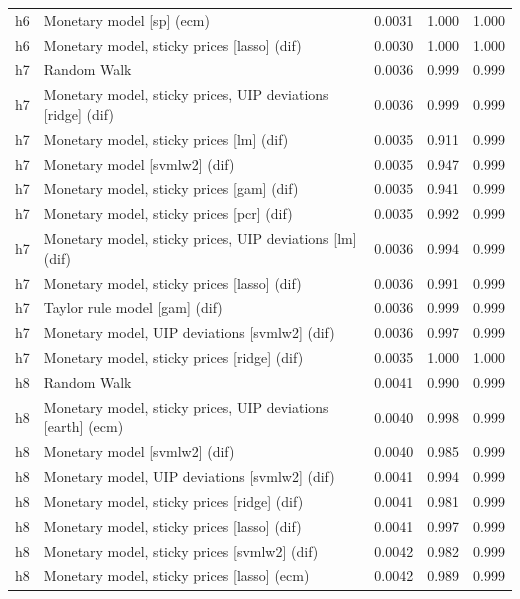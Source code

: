 \begin{ThreePartTable}
\begin{longtable}[t]{cp{5.5cm}ccc}
h6 & \raggedright Monetary model [sp] (ecm) & 0.0031 & 1.000 & 1.000\\
h6 & \raggedright Monetary model, sticky prices [lasso] (dif) & 0.0030 & 1.000 & 1.000\\
\addlinespace
h7 & \raggedright Random Walk & 0.0036 & 0.999 & 0.999\\
h7 & \raggedright Monetary model, sticky prices, UIP deviations [ridge] (dif) & 0.0036 & 0.999 & 0.999\\
h7 & \raggedright Monetary model, sticky prices [lm] (dif) & 0.0035 & 0.911 & 0.999\\
h7 & \raggedright Monetary model [svmlw2] (dif) & 0.0035 & 0.947 & 0.999\\
h7 & \raggedright Monetary model, sticky prices [gam] (dif) & 0.0035 & 0.941 & 0.999\\
h7 & \raggedright Monetary model, sticky prices [pcr] (dif) & 0.0035 & 0.992 & 0.999\\
h7 & \raggedright Monetary model, sticky prices, UIP deviations [lm] (dif) & 0.0036 & 0.994 & 0.999\\
h7 & \raggedright Monetary model, sticky prices [lasso] (dif) & 0.0036 & 0.991 & 0.999\\
h7 & \raggedright Taylor rule model [gam] (dif) & 0.0036 & 0.999 & 0.999\\
h7 & \raggedright Monetary model, UIP deviations [svmlw2] (dif) & 0.0036 & 0.997 & 0.999\\
h7 & \raggedright Monetary model, sticky prices [ridge] (dif) & 0.0035 & 1.000 & 1.000\\
\addlinespace
h8 & \raggedright Random Walk & 0.0041 & 0.990 & 0.999\\
h8 & \raggedright Monetary model, sticky prices, UIP deviations [earth] (ecm) & 0.0040 & 0.998 & 0.999\\
h8 & \raggedright Monetary model [svmlw2] (dif) & 0.0040 & 0.985 & 0.999\\
h8 & \raggedright Monetary model, UIP deviations [svmlw2] (dif) & 0.0041 & 0.994 & 0.999\\
h8 & \raggedright Monetary model, sticky prices [ridge] (dif) & 0.0041 & 0.981 & 0.999\\
h8 & \raggedright Monetary model, sticky prices [lasso] (dif) & 0.0041 & 0.997 & 0.999\\
h8 & \raggedright Monetary model, sticky prices [svmlw2] (dif) & 0.0042 & 0.982 & 0.999\\
h8 & \raggedright Monetary model, sticky prices [lasso] (ecm) & 0.0042 & 0.989 & 0.999\\

\end{longtable}
\end{ThreePartTable}
